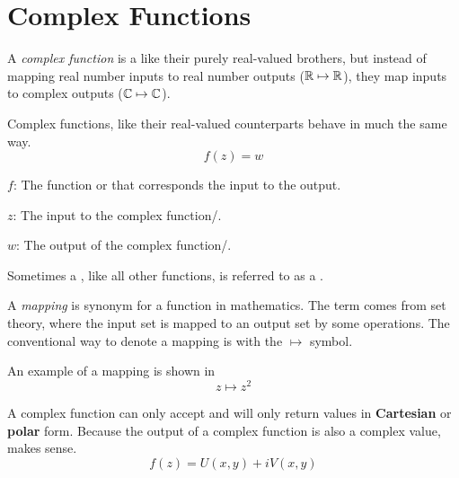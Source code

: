 \section{Complex Functions}\label{sec:Complex_Functions}
\begin{definition}\label{def:Complex_Function}
  A \emph{complex function} is a like their purely real-valued brothers, but instead of mapping real number inputs to real number outputs ($\operatorname{\mathbb{R}} \mapsto \operatorname{\mathbb{R}}$), they map  inputs to complex outputs ($\operatorname{\mathbb{C}} \mapsto \operatorname{\mathbb{C}}$).

  Complex functions, like their real-valued counterparts behave in much the same way.
  \begin{equation}\label{eq:Complex_Function}
    f(z) = w
  \end{equation}
  \begin{description}[noitemsep]
  \item $f$: The function or  that corresponds the input to the output.
  \item $z$: The input to the complex function/.
  \item $w$: The output of the complex function/.
  \end{description}
\end{definition}

Sometimes a , like all other functions, is referred to as a .

\begin{definition}[Mapping]\label{def:Mapping}
  A \emph{mapping} is synonym for a function in mathematics.
  The term comes from set theory, where the input set is mapped to an output set by some operations.
  The conventional way to denote a mapping is with the $\mapsto$ symbol.

  An example of a mapping is shown in 
  \begin{equation}\label{eq:Mapping}
    z \mapsto z^{2}
  \end{equation}
\end{definition}

A complex function can only accept and will only return values in \textbf{Cartesian} or \textbf{polar} form.
Because the output of a complex function is also a complex value,  makes sense.
\begin{equation}\label{eq:Output_Value_Function}
  f(z) = U(x, y) + iV(x, y)
\end{equation}

